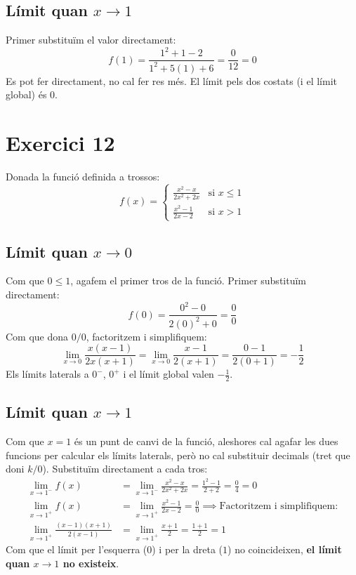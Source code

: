 \documentclass[12pt,a4paper]{article}
\begin{document}
\subsection*{Límit quan $x \to 1$}
Primer substituïm el valor directament:
\[ f(1) = \frac{1^2 + 1 - 2}{1^2 + 5(1) + 6} = \frac{0}{12} = 0 \]
Es pot fer directament, no cal fer res més. El límit pels dos costats (i el límit global) és $0$.

\vspace{0.5cm}
\section*{Exercici 12}
Donada la funció definida a trossos:
\[ f(x) = \begin{cases} \frac{x^2-x}{2x^2+2x} & \text{si } x \le 1 \\ \frac{x^2-1}{2x-2} & \text{si } x > 1 \end{cases} \]

\subsection*{Límit quan $x \to 0$}
Com que $0 \le 1$, agafem el primer tros de la funció. Primer substituïm directament:
\[ f(0) = \frac{0^2 - 0}{2(0)^2 + 0} = \frac{0}{0} \]
Com que dona $0/0$, factoritzem i simplifiquem:
\[ \lim_{x \to 0} \frac{x(x-1)}{2x(x+1)} = \lim_{x \to 0} \frac{x-1}{2(x+1)} = \frac{0-1}{2(0+1)} = -\frac{1}{2} \]
Els límits laterals a $0^-$, $0^+$ i el límit global valen $-\frac{1}{2}$.

\subsection*{Límit quan $x \to 1$}
Com que $x=1$ és un punt de canvi de la funció, aleshores cal agafar les dues funcions per calcular els límits laterals, però no cal substituir decimals (tret que doni $k/0$). Substituïm directament a cada tros:
\begin{align*}
    \lim_{x \to 1^-} f(x) &= \lim_{x \to 1^-} \frac{x^2-x}{2x^2+2x} = \frac{1^2-1}{2+2} = \frac{0}{4} = 0 \\
    \lim_{x \to 1^+} f(x) &= \lim_{x \to 1^+} \frac{x^2-1}{2x-2} = \frac{0}{0} \implies \text{Factoritzem i simplifiquem:} \\
    \lim_{x \to 1^+} \frac{(x-1)(x+1)}{2(x-1)} &= \lim_{x \to 1^+} \frac{x+1}{2} = \frac{1+1}{2} = 1
\end{align*}
Com que el límit per l'esquerra ($0$) i per la dreta ($1$) no coincideixen, \textbf{el límit quan $x \to 1$ no existeix}.
\end{document}
